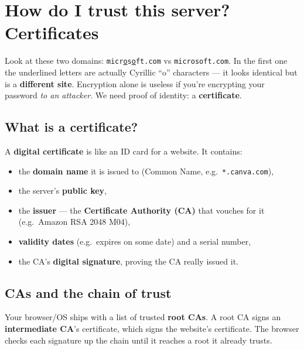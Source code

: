 \section{How do I trust this server? Certificates}
Look at these two domains: \texttt{micr\underline{o}s\underline{o}ft.com} vs \texttt{microsoft.com}. In the first one the underlined letters are actually Cyrillic ``o'' characters --- it looks identical but is a \textbf{different site}. Encryption alone is useless if you're encrypting your password \emph{to an attacker}. We need proof of identity: a \textbf{certificate}.

\subsection{What is a certificate?}
A \textbf{digital certificate} is like an ID card for a website. It contains:
\begin{itemize}
  \item the \textbf{domain name} it is issued to (Common Name, e.g.\ \texttt{*.canva.com}),
  \item the server's \textbf{public key},
  \item the \textbf{issuer} --- the \textbf{Certificate Authority (CA)} that vouches for it (e.g.\ Amazon RSA 2048 M04),
  \item \textbf{validity dates} (e.g.\ expires on some date) and a serial number,
  \item the CA's \textbf{digital signature}, proving the CA really issued it.
\end{itemize}

\subsection{CAs and the chain of trust}
Your browser/OS ships with a list of trusted \textbf{root CAs}. A root CA signs an \textbf{intermediate CA}'s certificate, which signs the website's certificate. The browser checks each signature up the chain until it reaches a root it already trusts.
\begin{center}
\end{center}

